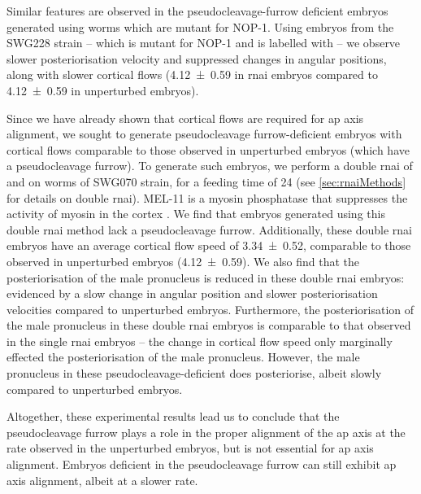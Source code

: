 Similar features are observed in the pseudocleavage-furrow deficient embryos generated using worms which are mutant for NOP-1. Using embryos from the SWG228 strain -- which is mutant for NOP-1 and is labelled with  -- we observe slower posteriorisation velocity and suppressed changes in angular positions, along with slower cortical flows (\SI{4.12 +- 0.59}{\unitCrtxVel} in \ac{rnai} embryos compared to \SI{4.12 +- 0.59}{\unitCrtxVel} in unperturbed embryos).

Since we have already shown that cortical flows are required for \ac{ap} axis alignment, we sought to generate pseudocleavage furrow-deficient embryos with cortical flows comparable to those observed in unperturbed embryos (which have a pseudocleavage furrow). To generate such embryos, we perform a double \ac{rnai} of  and  on worms of SWG070 strain, for a feeding time of \SI{24}{\unitRNAiTime} (see \autoref{sec:rnaiMethods} for details on double \ac{rnai}). MEL-11 is a myosin phosphatase \citep{piekny2002rho} that suppresses the activity of myosin in the cortex \citep{najafabadi2022orchestrating}. We find that embryos generated using this double \ac{rnai} method lack a pseudocleavage furrow. Additionally, these double \ac{rnai} embryos have an average cortical flow speed of \SI{3.34 +- 0.52}{\unitCrtxVel}, comparable to those observed in unperturbed embryos (\SI{4.12 +- 0.59}{\unitCrtxVel}). We also find that the posteriorisation of the male pronucleus is reduced in these double \ac{rnai} embryos: evidenced by a slow change in angular position and slower posteriorisation velocities compared to unperturbed embryos. Furthermore, the posteriorisation of the male pronucleus in these double  \ac{rnai} embryos is comparable to that observed in the single  \ac{rnai} embryos -- the change in cortical flow speed only marginally effected the posteriorisation of the male pronucleus. However, the male pronucleus in these pseudocleavage-deficient does posteriorise, albeit slowly compared to unperturbed embryos.

Altogether, these experimental results lead us to conclude that the pseudocleavage furrow plays a role in the proper alignment of the \ac{ap} axis at the rate observed in the unperturbed embryos, but is not essential for \ac{ap} axis alignment. Embryos deficient in the pseudocleavage furrow can still exhibit \ac{ap} axis alignment, albeit at a slower rate.

